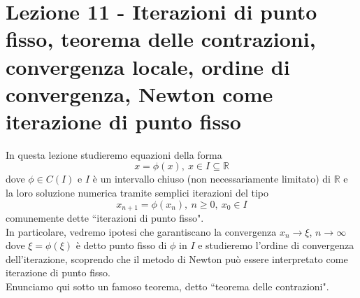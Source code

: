 \documentclass[12pt]{article}
\begin{document}
\section[Lezione 11 - Iterazioni di punto fisso]{Lezione 11 - Iterazioni di punto fisso, teorema delle contrazioni, convergenza locale, ordine di convergenza, Newton come iterazione di punto fisso}

In questa lezione studieremo equazioni della forma 
\[ x=\phi(x), \ x \in I \subseteq \mathbb{R} \]
dove $\phi \in C(I)$ e $I$ è un intervallo chiuso (non necessariamente limitato) di $\mathbb{R}$ e la loro soluzione numerica tramite semplici iterazioni del tipo
\[ x_{n+1} = \phi(x_n), \ n \geq 0, \ x_0 \in I \]
comunemente dette ``iterazioni di punto fisso".\\
In particolare, vedremo ipotesi che garantiscano la convergenza $x_n \rightarrow \xi$, $n \rightarrow \infty$ dove $\xi = \phi(\xi)$ è detto punto fisso di $\phi$ in $I$ e studieremo l'ordine di convergenza dell'iterazione, scoprendo che il metodo di Newton  può essere interpretato come iterazione di punto fisso. \\
Enunciamo qui sotto un famoso teorema, detto ``teorema delle contrazioni".
\end{document}
